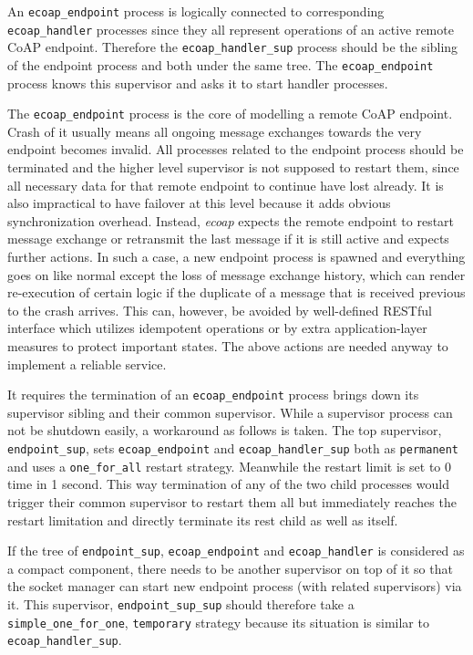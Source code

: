 An \verb|ecoap_endpoint| process is logically connected to corresponding \verb|ecoap_handler| processes since they all represent operations of an active remote CoAP endpoint. Therefore the \verb|ecoap_handler_sup| process should be the sibling of the endpoint process and both under the same tree. The \verb|ecoap_endpoint| process knows  this supervisor and asks it to start handler processes.

The \verb|ecoap_endpoint| process is the core of modelling a remote CoAP endpoint. Crash of it usually means all ongoing message exchanges towards the very endpoint becomes invalid. All processes related to the endpoint process should be terminated and the higher level supervisor is not supposed to restart them, since all necessary data for that remote endpoint to continue have lost already. It is also impractical to have failover at this level because it adds obvious synchronization overhead. Instead, \textit{ecoap} expects the remote endpoint to restart message exchange or retransmit the last message if it is still active and expects further actions. In such a case, a new endpoint process is spawned and everything goes on like normal except the loss of message exchange history, which can render re-execution of certain logic if the duplicate of a message that is received previous to the crash arrives. This can, however, be avoided by well-defined RESTful interface which utilizes idempotent operations or by extra application-layer measures to protect important states. The above actions are needed anyway to implement a reliable service.

It requires the termination of an \verb|ecoap_endpoint| process brings down its supervisor sibling and their common supervisor. While a supervisor process can not be shutdown easily, a workaround as follows is taken. The top supervisor, \verb|endpoint_sup|, sets \verb|ecoap_endpoint| and \verb|ecoap_handler_sup| both as \verb|permanent| and uses a \verb|one_for_all| restart strategy. Meanwhile the restart limit is set to 0 time in 1 second. This way termination of any of the two child processes would trigger their common supervisor to restart them all but immediately reaches the restart limitation and directly terminate its rest child as well as itself. 

If the tree of \verb|endpoint_sup|, \verb|ecoap_endpoint| and \verb|ecoap_handler| is considered as a compact component, there needs to be another supervisor on top of it so that the socket manager can start new endpoint process (with related supervisors) via it. This supervisor, \verb|endpoint_sup_sup| should therefore take a \verb|simple_one_for_one|, \verb|temporary| strategy because its situation is similar to \verb|ecoap_handler_sup|. 

